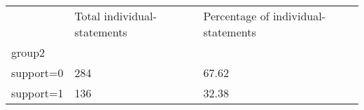 \documentclass{article}
\begin{document}
\begin{table}[!h]
\centering
\begin{tabular}{lll}
\cline{1-3}
\multicolumn{1}{|l}{} &
  \multicolumn{1}{|l}{Total individual-statements} &
  \multicolumn{1}{|l|}{Percentage of individual-statements} \\
\cline{1-3}
\multicolumn{1}{|l}{group2} &
  \multicolumn{1}{|l}{} &
  \multicolumn{1}{|l|}{} \\
\cline{1-3}
\multicolumn{1}{|l}{support=0} &
  \multicolumn{1}{|l}{284} &
  \multicolumn{1}{|l|}{67.62} \\
\cline{1-3}
\multicolumn{1}{|l}{support=1} &
  \multicolumn{1}{|l}{136} &
  \multicolumn{1}{|l|}{32.38} \\
\cline{1-3}
\end{tabular}
\end{table}
\end{document}
